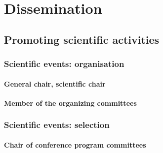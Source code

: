 

\section{Dissemination}
\label{DIVERSE:dissemination}

\subsection{Promoting scientific activities}
\label{DIVERSE:animation}

\subsubsection{Scientific events: organisation}
\label{DIVERSE:animation-eventorga}

\paragraph{General chair, scientific chair}
\label{DIVERSE:animation-eventorga-chair}

\paragraph{Member of the organizing committees}
\label{DIVERSE:animation-eventorga-comittee}

\subsubsection{Scientific events: selection}
\label{DIVERSE:animation-eventselect}

\paragraph{Chair of conference program committees}
\label{DIVERSE:animation-eventselect-chair}

